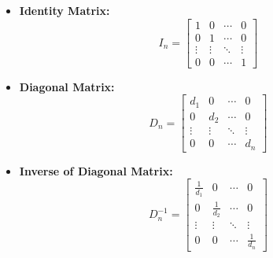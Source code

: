 \documentclass{article}
\begin{document}
\begin{itemize}
    \item \textbf{Identity Matrix:}
    \begin{equation}
        I_n =
        \left[
            \begin{array}{cccc}
                1 & 0 & \cdots & 0 \\
                0 & 1 & \cdots & 0 \\
                \vdots & \vdots & \ddots & \vdots \\
                0 & 0 & \cdots & 1
            \end{array}
        \right]
        \label{eq:iden}
    \end{equation}

    \item \textbf{Diagonal Matrix:}
    \begin{equation}
        D_n =
        \left[
            \begin{array}{cccc}
                d_1 & 0 & \cdots & 0 \\
                0 & d_2 & \cdots & 0 \\
                \vdots & \vdots & \ddots & \vdots \\
                0 & 0 & \cdots & d_n
            \end{array}
        \right]
        \label{eq:diagm}
    \end{equation}

    \item \textbf{Inverse of Diagonal Matrix:}
    \begin{equation}
        D_n^{-1} =
        \left[
            \begin{array}{cccc}
                \frac{1}{d_1} & 0 & \cdots & 0 \\
                0 & \frac{1}{d_2} & \cdots & 0 \\
                \vdots & \vdots & \ddots & \vdots \\
                0 & 0 & \cdots & \frac{1}{d_n}
            \end{array}
        \right]
        \label{eq:diagminv}
    \end{equation}

\end{itemize}
\end{document}
